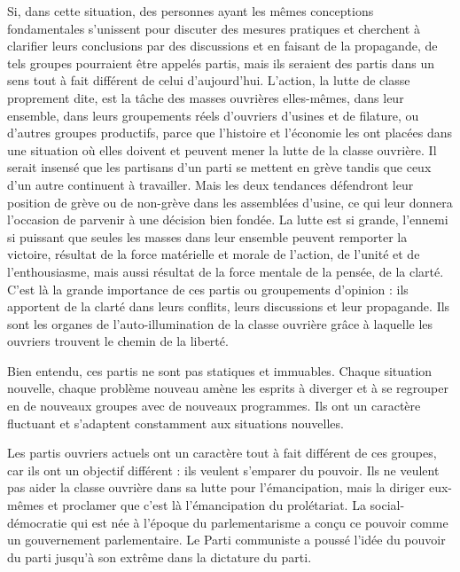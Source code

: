 Si, dans cette situation, des personnes ayant les mêmes conceptions fondamentales s’unissent pour discuter des mesures pratiques et cherchent à clarifier leurs conclusions par des discussions et en faisant de la propagande, de tels groupes pourraient être appelés partis, mais ils seraient des partis dans un sens tout à fait différent de celui d’aujourd’hui. L'action, la lutte de classe proprement dite, est la tâche des masses ouvrières elles-mêmes, dans leur ensemble, dans leurs groupements réels d'ouvriers d'usines et de filature, ou d'autres groupes productifs, parce que l'histoire et l'économie les ont placées dans une situation où elles doivent et peuvent mener la lutte de la classe ouvrière. Il serait insensé que les partisans d'un parti se mettent en grève tandis que ceux d'un autre continuent à travailler. Mais les deux tendances défendront leur position de grève ou de non-grève dans les assemblées d'usine, ce qui leur donnera l'occasion de parvenir à une décision bien fondée. La lutte est si grande, l'ennemi si puissant que seules les masses dans leur ensemble peuvent remporter la victoire, résultat de la force matérielle et morale de l'action, de l'unité et de l'enthousiasme, mais aussi résultat de la force mentale de la pensée, de la clarté. C'est là la grande importance de ces partis ou groupements d'opinion : ils apportent de la clarté dans leurs conflits, leurs discussions et leur propagande. Ils sont les organes de l'auto-illumination de la classe ouvrière grâce à laquelle les ouvriers trouvent le chemin de la liberté.

Bien entendu, ces partis ne sont pas statiques et immuables. Chaque situation nouvelle, chaque problème nouveau amène les esprits à diverger et à se regrouper en de nouveaux groupes avec de nouveaux programmes. Ils ont un caractère fluctuant et s'adaptent constamment aux situations nouvelles.

Les partis ouvriers actuels ont un caractère tout à fait différent de ces groupes, car ils ont un objectif différent : ils veulent s'emparer du pouvoir. Ils ne veulent pas aider la classe ouvrière dans sa lutte pour l'émancipation, mais la diriger eux-mêmes et proclamer que c'est là l'émancipation du prolétariat. La social-démocratie qui est née à l'époque du parlementarisme a conçu ce pouvoir comme un gouvernement parlementaire. Le Parti communiste a poussé l'idée du pouvoir du parti jusqu'à son extrême dans la dictature du parti.

